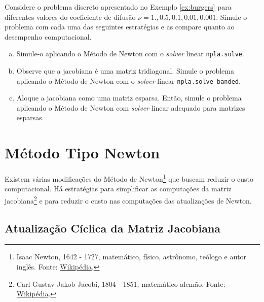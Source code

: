 \begin{exer}\label{exer:burgers}
  Considere o problema discreto apresentado no Exemplo \ref{ex:burgers} para diferentes valores do coeficiente de difusão $\nu=1., 0.5, 0.1, 0.01, 0.001$. Simule o problema com cada uma das seguintes estratégias e as compare quanto ao desempenho computacional.
  \begin{enumerate}[a)]
  \item Simule-o aplicando o Método de Newton com o {\it solver} linear \lstinline+npla.solve+.
  \item Observe que a jacobiana é uma matriz tridiagonal. Simule o problema aplicando o Método de Newton com o {\it solver} linear \lstinline+npla.solve_banded+.
  \item Aloque a jacobiana como uma matriz esparsa. Então, simule o problema aplicando o Método de Newton com {\it solver} linear adequado para matrizes esparsas.
  \end{enumerate}
\end{exer}

\section{Método Tipo Newton}\label{cap_otimizacao_sec_tipoNewton}

Existem várias modificações do Método de Newton\footnote{Isaac Newton, 1642 - 1727, matemático, físico, astrônomo, teólogo e autor inglês. Fonte: \href{https://pt.wikipedia.org/wiki/Isaac_Newton}{Wikipédia}.} que buscam reduzir o custo computacional. Há estratégias para simplificar as computações da matriz jacobiana\footnote{Carl Gustav Jakob Jacobi, 1804 - 1851, matemático alemão. Fonte: \href{https://pt.wikipedia.org/wiki/Carl_Gustav_Jakob_Jacobi}{Wikipédia}.} e para reduzir o custo nas computações das atualizações de Newton.

\subsection{Atualização Cíclica da Matriz Jacobiana}

